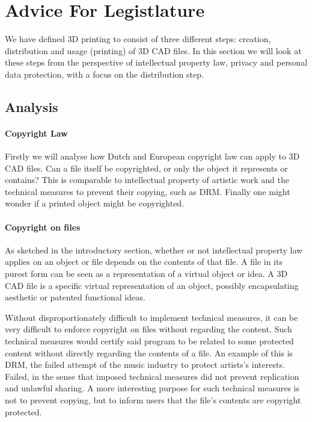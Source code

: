\section{Advice For Legistlature}

We have defined 3D printing to consist of three different steps: creation, 
distribution and usage (printing) of 3D CAD files.
In this section we will look at these steps from the perspective of intellectual
 property law, privacy and personal data protection, with a focus on the 
 distribution step.


\subsection{Analysis}

\paragraph{Copyright Law}
Firstly we will analyse how Dutch and European copyright law can apply to 3D CAD
 files.
Can a file itself be copyrighted, or only the object it represents or contains? 
This is comparable to intellectual property of artistic work and the technical 
measures to prevent their copying, such as DRM.
Finally one might wonder if a printed object might be copyrighted.

\paragraph{Copyright on files}
As sketched in the introductory section, whether or not intellectual property 
law applies on an object or file depends on the contents of that file.
A file in its purest form can be seen as a representation of a virtual object or
 idea.
A 3D CAD file is a specific virtual representation of an object, possibly 
encapsulating aesthetic or patented functional ideas.

Without disproportionately difficult to implement technical measures, it can be 
very difficult to enforce copyright on files without regarding the content.
Such technical measures would certify said program to be related to some 
protected content without directly regarding the contents of a file.
An example of this is DRM, the failed attempt of the music industry to protect 
artists's interests.
Failed, in the sense that imposed technical measures did not prevent replication
 and unlawful sharing.
A more interesting purpose for such technical measures is not to prevent 
copying, but to inform users that the file’s contents are copyright protected.

